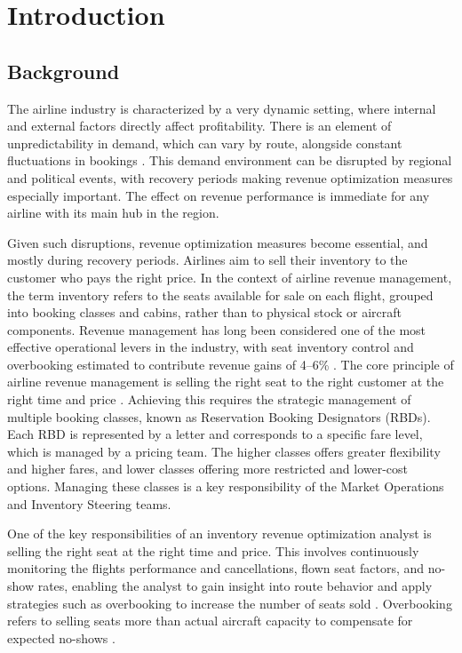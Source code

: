 \chapter{Introduction}
\label{ch:introduction}

\section{Background}
\label{sec:background}

The airline industry is characterized by a very dynamic setting, where internal and external factors directly affect profitability. There is an element of unpredictability in demand, which can vary by route, alongside constant fluctuations in bookings \citep{PakPiersma2002, Belobaba1987}. This demand environment can be disrupted by regional and political events, with recovery periods making revenue optimization measures especially important. The effect on revenue performance is immediate for any airline with its main hub in the region.

Given such disruptions, revenue optimization measures become essential, and mostly during recovery periods. Airlines aim to sell their inventory to the customer who pays the right price. In the context of airline revenue management, the term inventory refers to the seats available for sale on each flight, grouped into booking classes and cabins, rather than to physical stock or aircraft components. Revenue management has long been considered one of the most effective operational levers in the industry, with seat inventory control and overbooking estimated to contribute revenue gains of 4--6\% \citep{Belobaba1989, PakPiersma2002}. The core principle of airline revenue management is selling the right seat to the right customer at the right time and price \citep{SomboonAmaruchkul2016}. Achieving this requires the strategic management of multiple booking classes, known as Reservation Booking Designators (RBDs). Each RBD is represented by a letter and corresponds to a specific fare level, which is managed by a pricing team. The higher classes offers greater flexibility and higher fares, and lower classes offering more restricted and lower-cost options. Managing these classes is a key responsibility of the Market Operations and Inventory Steering teams.

One of the key responsibilities of an inventory revenue optimization analyst is selling the right seat at the right time and price. This involves continuously monitoring the flights performance and cancellations, flown seat factors, and no-show rates, enabling the analyst to gain insight into route behavior and apply strategies such as overbooking to increase the number of seats sold \citep{Belobaba1987}. Overbooking refers to selling seats more than actual aircraft capacity to compensate for expected no-shows \citep{SomboonAmaruchkul2016}.

